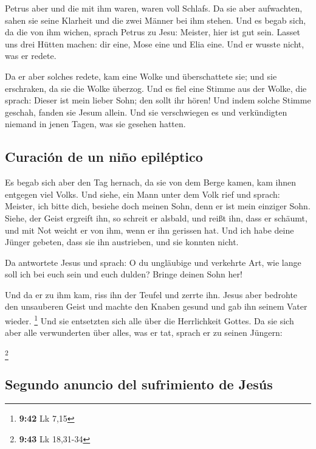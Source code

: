  Petrus aber und die mit ihm waren, waren voll Schlafs.
Da sie aber aufwachten, sahen sie seine Klarheit und die zwei Männer bei
ihm stehen.  Und es begab sich, da die von ihm wichen,
sprach Petrus zu Jesu: Meister, hier ist gut sein. Lasset uns drei
Hütten machen: dir eine, Mose eine und Elia eine. Und er wusste nicht,
was er redete.

 Da er aber solches redete, kam eine Wolke und
überschattete sie; und sie erschraken, da sie die Wolke überzog.
 Und es fiel eine Stimme aus der Wolke, die sprach:
Dieser ist mein lieber Sohn; den sollt ihr hören!  Und
indem solche Stimme geschah, fanden sie Jesum allein. Und sie
verschwiegen es und verkündigten niemand in jenen Tagen, was sie gesehen
hatten.

\hypertarget{curaciuxf3n-de-un-niuxf1o-epiluxe9ptico}{%
\subsection{Curación de un niño
epiléptico}\label{curaciuxf3n-de-un-niuxf1o-epiluxe9ptico}}

 Es begab sich aber den Tag hernach, da sie von dem Berge
kamen, kam ihnen entgegen viel Volks.  Und siehe, ein
Mann unter dem Volk rief und sprach: Meister, ich bitte dich, besiehe
doch meinen Sohn, denn er ist mein einziger Sohn.  Siehe,
der Geist ergreift ihn, so schreit er alsbald, und reißt ihn, dass er
schäumt, und mit Not weicht er von ihm, wenn er ihn gerissen hat.
 Und ich habe deine Jünger gebeten, dass sie ihn
austrieben, und sie konnten nicht.

 Da antwortete Jesus und sprach: O du ungläubige und
verkehrte Art, wie lange soll ich bei euch sein und euch dulden? Bringe
deinen Sohn her!

 Und da er zu ihm kam, riss ihn der Teufel und zerrte
ihn. Jesus aber bedrohte den unsauberen Geist und machte den Knaben
gesund und gab ihn seinem Vater wieder. \footnote{\textbf{9:42} Lk 7,15}
 Und sie entsetzten sich alle über die Herrlichkeit
Gottes. Da sie sich aber alle verwunderten über alles, was er tat,
sprach er zu seinen Jüngern:

\footnote{\textbf{9:43} Lk 18,31-34}

\hypertarget{segundo-anuncio-del-sufrimiento-de-jesuxfas}{%
\subsection{Segundo anuncio del sufrimiento de
Jesús}\label{segundo-anuncio-del-sufrimiento-de-jesuxfas}}

